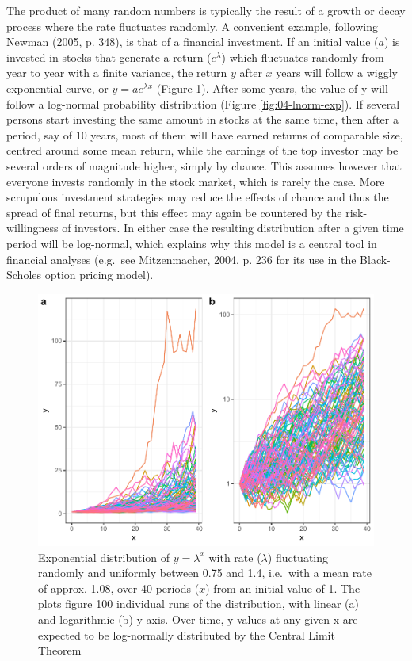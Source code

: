 \documentclass[
  12pt,
]{book}
\begin{document}
The product of many random numbers is typically the result of a growth or decay process where the rate fluctuates randomly. A convenient example, following Newman (2005, p. 348), is that of a financial investment. If an initial value (\(a\)) is invested in stocks that generate a return (\(e^\lambda\)) which fluctuates randomly from year to year with a finite variance, the return \(y\) after \(x\) years will follow a wiggly exponential curve, or \(y = a e^{\lambda x}\) (Figure \ref{fig:04-multi-exp}). After some years, the value of y will follow a log-normal probability distribution (Figure \ref{fig:04-lnorm-exp}). If several persons start investing the same amount in stocks at the same time, then after a period, say of 10 years, most of them will have earned returns of comparable size, centred around some mean return, while the earnings of the top investor may be several orders of magnitude higher, simply by chance. This assumes however that everyone invests randomly in the stock market, which is rarely the case. More scrupulous investment strategies may reduce the effects of chance and thus the spread of final returns, but this effect may again be countered by the risk-willingness of investors. In either case the resulting distribution after a given time period will be log-normal, which explains why this model is a central tool in financial analyses (e.g.~see Mitzenmacher, 2004, p. 236 for its use in the Black-Scholes option pricing model).



\begin{figure}

{\centering \includegraphics[width=0.9\linewidth]{bookdown-demo_files/figure-latex/04-multi-exp-1} 

}

\caption{Exponential distribution of \(y = \lambda ^x\) with rate (\(\lambda\)) fluctuating randomly and uniformly between 0.75 and 1.4, i.e.~with a mean rate of approx. 1.08, over 40 periods (\(x\)) from an initial value of 1. The plots figure 100 individual runs of the distribution, with linear (a) and logarithmic (b) y-axis. Over time, y-values at any given x are expected to be log-normally distributed by the Central Limit Theorem}\label{fig:04-multi-exp}
\end{figure}
\end{document}
